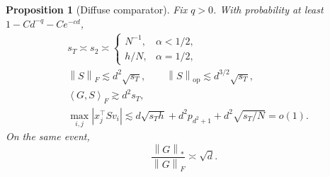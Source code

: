 \documentclass[11pt]{article}
\newtheorem{proposition}[proposition]{Proposition}
\theoremstyle{definition}
\newcommand{\ip}[2]{\left\langle #1,#2\right\rangle_F}
\newcommand{\normF}[1]{\left\lVert #1\right\rVert_F}
\newcommand{\normop}[1]{\left\lVert #1\right\rVert_{\mathrm{op}}}
\newcommand{\normnuc}[1]{\left\lVert #1\right\rVert_*}
\begin{document}
\begin{proposition}[Diffuse comparator]
\label{prop:diffuse-comparator}
Fix $q>0$.  With probability at least
$1-Cd^{-q}-Ce^{-cd}$,
\begin{align}
 &s_T\asymp s_2\asymp
 \begin{cases}
 N^{-1},&\alpha<1/2,\\
 h/N,&\alpha=1/2,
 \end{cases}
 \label{eq:diffuse-mass}\\
 &\normF{S}\lesssim d^2\sqrt{s_T},
 \qquad
 \normop{S}\lesssim d^{3/2}\sqrt{s_T},
 \label{eq:diffuse-norms}\\
 &\ip{G}{S}\gtrsim d^2s_T,
 \label{eq:diffuse-alignment}\\
 &\max_{i,j}|x_j^\top Sv_i|
 \lesssim
 d\sqrt{s_Th}+d^2p_{d^2+1}
 +d^2\sqrt{s_T/N}=o(1).
 \label{eq:diffuse-logits}
\end{align}
On the same event,
\begin{equation}
 \frac{\normnuc{G}}{\normF{G}}\asymp\sqrt d.
 \label{eq:diffuse-nuclear}
\end{equation}
\end{proposition}
\end{document}
